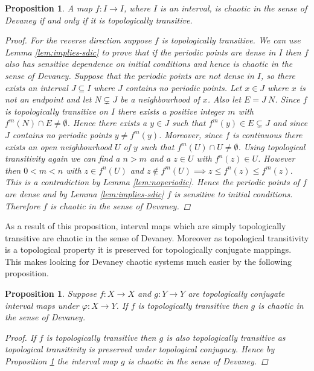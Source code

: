 \documentclass[11pt,a4paper,oneside]{memoir}
\theoremstyle{plain}
\newtheorem{prop}[thm]{Proposition}
\theoremstyle{definition}
\begin{document}
\begin{prop}\label{prop:chaotic-transitive}
    A map $f: I \to I$, where $I$ is an interval, is chaotic in the sense of Devaney if and only if it is topologically transitive.
    \begin{proof}
        For the reverse direction suppose $f$ is topologically transitive. We can use Lemma \ref{lem:implies-sdic} to prove that if the periodic points are dense in $I$ then $f$ also has sensitive dependence on initial conditions and hence is chaotic in the sense of Devaney. Suppose that the periodic points are not dense in $I$, so there exists an interval $J \subseteq I$ where $J$ contains no periodic points. Let $x \in J$ where $x$ is not an endpoint and let $N \subsetneq J$ be a neighbourhood of $x$. Also let $E = J \ N$. Since $f$ is topologically transitive on $I$ there exists a positive integer $m$ with $f^m(N) \cap E \neq \emptyset$. Hence there exists a $y \in J$ such that $f^m(y) \in E \subsetneq J$ and since $J$ contains no periodic points $y \neq f^m(y)$. Moreover, since $f$ is continuous there exists an open neighbourhood $U$ of $y$ such that $f^m(U) \cap U \neq \emptyset$. Using topological transitivity again we can find a $n > m$ and a $z \in U$ with $f^n(z) \in U$. However then $0 < m < n$ with $z \in f^n(U)$ and $z \notin f^m(U) \implies z \leq f^n(z) \leq f^m(z)$. This is a contradiction by Lemma \ref{lem:noperiodic}. Hence the periodic points of $f$ are dense and by Lemma \ref{lem:implies-sdic} $f$ is sensitive to initial conditions. Therefore $f$ is chaotic in the sense of Devaney.
    \end{proof}
\end{prop}

As a result of this proposition, interval maps which are simply topologically transitive are chaotic in the sense of Devaney. Moreover as topological transitivity is a topological property it is preserved for topologically conjugate mappings. This makes looking for Devaney chaotic systems much easier by the following proposition.

\begin{prop}
    Suppose $f: X \to X$ and $g: Y \to Y$ are topologically conjugate interval maps under $\varphi: X \to Y$. If $f$ is topologically transitive then $g$ is chaotic in the sense of Devaney.
    \begin{proof}
        If $f$ is topologically transitive then $g$ is also topologically transitive as topological transitivity is preserved under topological conjugacy. Hence by Proposition \ref{prop:chaotic-transitive} the interval map $g$ is chaotic in the sense of Devaney.
    \end{proof}
\end{prop}
\end{document}
